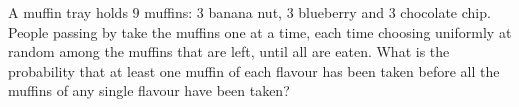 A muffin tray holds $9$ muffins: $3$ banana nut, $3$ blueberry and $3$ chocolate chip. People passing by take the muffins one at a time, each time choosing uniformly at random among the muffins that are left, until all are eaten. What is the probability that at least one muffin of each flavour has been taken before all the muffins of any single flavour have been taken?
